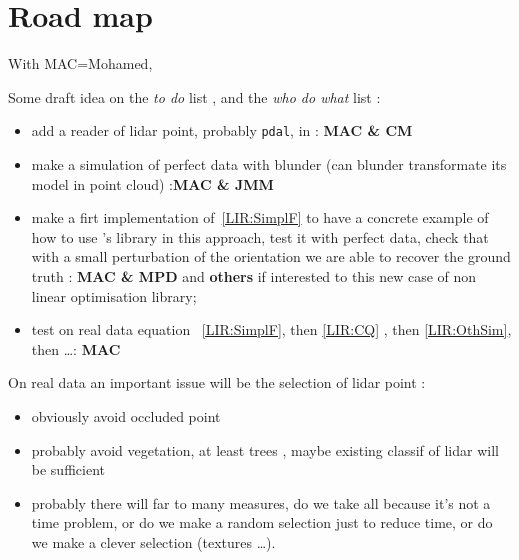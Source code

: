 
\section{Road map}

With MAC=Mohamed,

Some draft idea on the \emph{to do} list , and the  \emph{who do what} list :

\begin{itemize}
    \item  add a reader of lidar point, probably {\tt pdal}, in \PPP  :  {\bf MAC \& CM}

    \item  make a simulation of perfect data with blunder  (can blunder transformate its model in point cloud) :{\bf MAC \& JMM}

    \item make a firt implementation of~\ref{LIR:SimplF} to have a concrete example of 
         how to use  \PPP's library in this approach, test it with perfect data, check that  with
         a small perturbation of the orientation we are able to recover the ground truth :
         {\bf  MAC \& MPD} and {\bf  others} if interested to this new case of non linear optimisation library;

    \item test on real data equation ~\ref{LIR:SimplF}, then \ref{LIR:CQ} , then \ref{LIR:OthSim}, then \dots  : {\bf MAC} 
\end{itemize}

On real data an important issue will be  the selection of lidar point  : 

\begin{itemize}
     \item  obviously  avoid occluded point
     \item  probably   avoid vegetation, at least trees , maybe existing classif of lidar will be sufficient
     \item  probably there will far to many measures,  do we take all because it's not a time problem, 
            or do we make a random selection just to reduce time, or do we make a clever selection (textures \dots).
\end{itemize}







